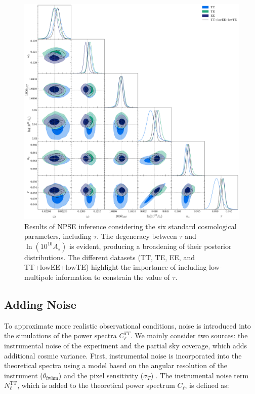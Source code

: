 \begin{figure}
    \centering
    \includegraphics[scale=0.3]{img/data_comparison_tau_100000_1.pdf}
    \caption{Results of NPSE inference considering the six standard cosmological parameters, including $\tau$. The degeneracy between $\tau$ and $\ln(10^{10}A_s)$ is evident, producing a broadening of their posterior distributions. The different datasets (TT, TE, EE, and TT+lowEE+lowTE) highlight the importance of including low-multipole information to constrain the value of $\tau$.}
    \label{fig:parameters_inference_tau}
\end{figure}

\subsection{Adding Noise}
To approximate more realistic observational conditions, noise is introduced into the simulations of the power spectra $C_{\ell}^{TT}$. We mainly consider two sources: the instrumental noise of the experiment and the partial sky coverage, which adds additional cosmic variance. First, instrumental noise is incorporated into the theoretical spectra using a model based on the angular resolution of the instrument (\(\theta_{\text{fwhm}}\)) and the pixel sensitivity (\(\sigma_T\)) \cite{noiseCole}. The instrumental noise term \(N_\ell^{\mathrm{TT}}\), which is added to the theoretical power spectrum \(C_\ell\), is defined as:

